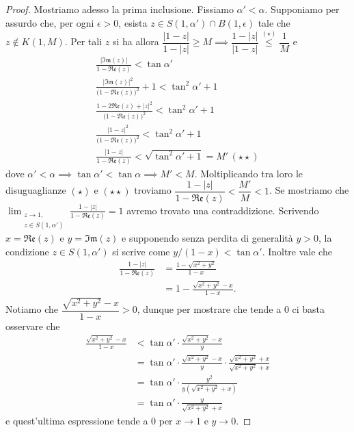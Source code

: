 \begin{proof}
  Mostriamo adesso la prima inclusione. Fissiamo $\alpha'<\alpha$. Supponiamo per assurdo che, per ogni $\epsilon>0$, esista $z \in S(1,\alpha')\cap B(1,\epsilon)$ tale che $z \not\in K(1,M)$. Per tali $z$ si ha allora $\dfrac{|1-z|}{1-|z|} \ge M \implies \dfrac{1-|z|}{|1-z|} \overset{(\star)}{\le} \dfrac{1}{M}$ e
  \begin{gather*}
    \frac{|\mathfrak{Im}(z)|}{1-\mathfrak{Re}(z)}<\tan{\alpha'} \\
    \frac{|\mathfrak{Im}(z)|^2}{\bigl(1-\mathfrak{Re}(z)\bigr)^2}+1<\tan^2{\alpha'}+1 \\
    \frac{1-2\mathfrak{Re}(z)+|z|^2}{\bigl(1-\mathfrak{Re}(z)\bigr)^2}<\tan^2{\alpha'}+1 \\
    \frac{|1-z|^2}{\bigl(1-\mathfrak{Re}(z)\bigr)^2}<\tan^2{\alpha'}+1 \\
    \frac{|1-z|}{1-\mathfrak{Re}(z)}<\sqrt{\tan^2{\alpha'}+1}=M' \, (\star\star)
  \end{gather*}
  dove $\alpha'<\alpha \implies \tan{\alpha'}<\tan{\alpha} \implies M'<M$. Moltiplicando tra loro le disuguaglianze $(\star)$ e $(\star\star)$ troviamo $\dfrac{1-|z|}{1-\mathfrak{Re}(z)}<\dfrac{M'}{M}<1$.
  Se mostriamo che $\displaystyle \lim_{\substack{z \longrightarrow 1, \\ z \in S(1,\alpha')}} \frac{1-|z|}{1-\mathfrak{Re}(z)}=1$ avremo trovato una contraddizione. Scrivendo $x=\mathfrak{Re}(z)$ e $y=\mathfrak{Im}(z)$ e supponendo senza perdita di generalità $y>0$, la condizione $z \in S(1,\alpha')$ si scrive come $y/(1-x)<\tan{\alpha'}$. Inoltre vale che
  \begin{align*}
    \frac{1-|z|}{1-\mathfrak{Re}(z)} &=\frac{1-\sqrt{x^2+y^2}}{1-x} \\
    & =1-\frac{\sqrt{x^2+y^2}-x}{1-x}.
  \end{align*}
  Notiamo che $\dfrac{\sqrt{x^2+y^2}-x}{1-x}>0$, dunque per mostrare che tende a $0$ ci basta osservare che
  \begin{align*}
    \frac{\sqrt{x^2+y^2}-x}{1-x} & < \tan{\alpha'}\cdot\frac{\sqrt{x^2+y^2}-x}{y} \\
    & =\tan{\alpha'}\cdot\frac{\sqrt{x^2+y^2}-x}{y}\cdot\frac{\sqrt{x^2+y^2}+x}{\sqrt{x^2+y^2}+x} \\
    & =\tan{\alpha'}\cdot\frac{y^2}{y(\sqrt{x^2+y^2}+x)} \\
    & =\tan{\alpha'}\cdot\frac{y}{\sqrt{x^2+y^2}+x}
  \end{align*}
  e quest'ultima espressione tende a $0$ per $x \longrightarrow 1$ e $y \longrightarrow 0$.
\end{proof}


